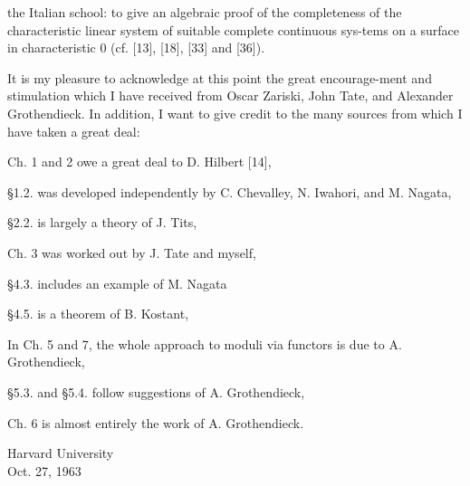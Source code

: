 the Italian school: to give an algebraic proof of the completeness of the characteristic linear system of suitable complete continuous sys-tems on a surface in characteristic 0 (cf. [13], [18], [33] and [36]).

It is my pleasure to acknowledge at this point the great encourage-ment and stimulation which I have received from Oscar Zariski, John Tate, and Alexander Grothendieck. In addition, I want to give credit to the many sources from which I have taken a great deal:

Ch. 1 and 2 owe a great deal to D. Hilbert [14],

\S1.2. was developed independently by C. Chevalley, N. Iwahori, and M. Nagata,

\S2.2. is largely a theory of J. Tits,

Ch. 3 was worked out by J. Tate and myself,

\S4.3. includes an example of M. Nagata

\S4.5. is a theorem of B. Kostant,

In Ch. 5 and 7, the whole approach to moduli via functors is due to A. Grothendieck,

\S5.3. and \S5.4. follow suggestions of A. Grothendieck,

Ch. 6 is almost entirely the work of A. Grothendieck.

\begin{flushright}Harvard University\\Oct. 27, 1963\end{flushright}

